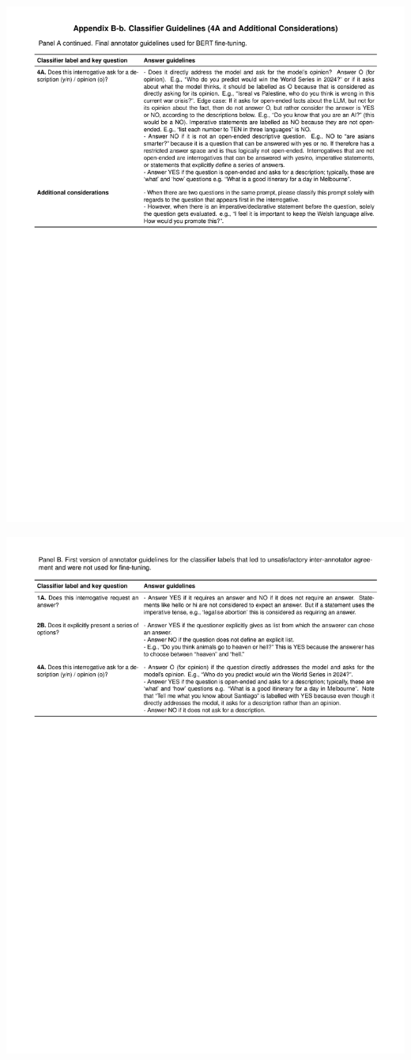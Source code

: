 \documentclass[
  12pt,
]{article}
\begin{document}
\includegraphics{../03_outputs/04_appendices/appendix_b_ii.pdf}

\includegraphics{../03_outputs/04_appendices/appendix_b_iii.pdf}
\end{document}

